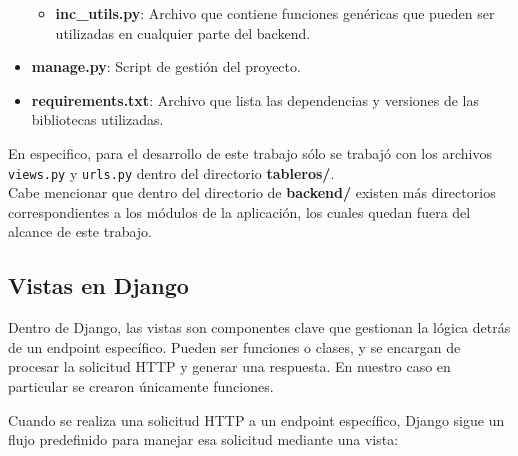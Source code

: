 \begin{itemize}[]
\begin{itemize}
      \item \textbf{inc\_utils.py}: Archivo que contiene funciones genéricas que pueden ser utilizadas en cualquier parte del backend.
  \end{itemize}
  
  \item \textbf{manage.py}: Script de gestión del proyecto.

  \item \textbf{requirements.txt}: Archivo que lista las dependencias y versiones de las bibliotecas utilizadas.\\
\end{itemize}

En especifico, para el desarrollo de este trabajo sólo se trabajó con los archivos \texttt{views.py} y \texttt{urls.py} dentro del directorio \textbf{tableros/}. \\
Cabe mencionar que dentro del directorio de \textbf{backend/} existen más directorios correspondientes a los módulos de la aplicación, los cuales quedan fuera del alcance de este trabajo.


\subsection{Vistas en Django}
Dentro de Django, las vistas son componentes clave que gestionan la lógica detrás de un endpoint específico. Pueden ser funciones o clases, y se encargan de procesar la solicitud HTTP y generar una respuesta. En nuestro caso en particular se crearon únicamente funciones.

Cuando se realiza una solicitud HTTP a un endpoint específico, Django sigue un flujo predefinido para manejar esa solicitud mediante una vista:

